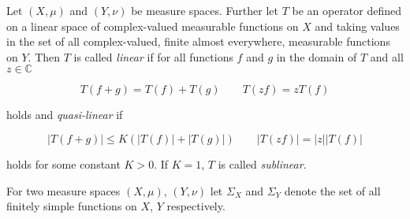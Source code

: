 \vspace{2mm}

\begin{mdframed}
	\begin{definition}
		Let $(X,\mu)$ and $(Y,\nu)$ be measure spaces. Further let $T$ be an operator defined on a linear space of complex-valued measurable functions on $X$ and taking values in the set of all complex-valued, finite almost everywhere, measurable functions on $Y$. Then $T$ is called \emph{linear} if for all functions $f$ and $g$ in the domain of $T$ and all $z \in \mathbb{C}$ 

		\begin{equation*}
			T\left( f + g \right) = T(f) + T(g) \qquad T\left( zf \right) = zT(f)
		\end{equation*}

		holds and \emph{quasi-linear} if

		\begin{equation*}
			\left| T\left( f + g \right) \right| \leqslant K \left( \left| T(f)\right| + \left| T(g)\right| \right) \qquad \left| T(zf) \right| = \left| z\right| \left| T(f)\right|
		\end{equation*}

		holds for some constant $K > 0$. If $K = 1$, $T$ is called \emph{sublinear}.
	\end{definition}
\end{mdframed}

\vspace{2mm}

For two measure spaces $\left( X,\mu \right)$, $\left( Y,\nu \right)$ let $\Sigma_X$ and $\Sigma_Y$ denote the set of all finitely simple functions on $X$, $Y$ respectively. 

\vspace{2mm}

